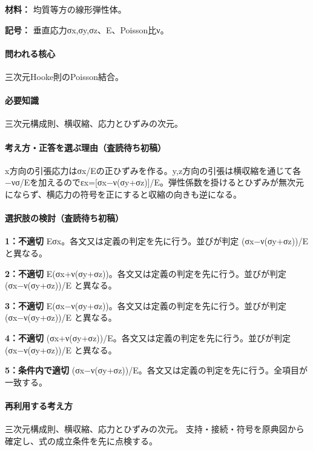 \noindent\textbf{材料：} 均質等方の線形弾性体。\par

\noindent\textbf{記号：} 垂直応力σx,σy,σz、E、Poisson比ν。\par

\paragraph{問われる核心} 三次元Hooke則のPoisson結合。

\paragraph{必要知識} 三次元構成則、横収縮、応力とひずみの次元。

\paragraph{考え方・正答を選ぶ理由（査読待ち初稿）} x方向の引張応力はσx/Eの正ひずみを作る。y,z方向の引張は横収縮を通じて各−νσ/Eを加えるのでεx=[σx−ν(σy+σz)]/E。弾性係数を掛けるとひずみが無次元にならず、横応力の符号を正にすると収縮の向きも逆になる。

\paragraph{選択肢の検討（査読待ち初稿）}\mbox{}\par

\noindent\textbf{1：不適切} Eσx。各文又は定義の判定を先に行う。並びが判定 (σx−ν(σy+σz))/E と異なる。\par

\noindent\textbf{2：不適切} E(σx+ν(σy+σz))。各文又は定義の判定を先に行う。並びが判定 (σx−ν(σy+σz))/E と異なる。\par

\noindent\textbf{3：不適切} E(σx−ν(σy+σz))。各文又は定義の判定を先に行う。並びが判定 (σx−ν(σy+σz))/E と異なる。\par

\noindent\textbf{4：不適切} (σx+ν(σy+σz))/E。各文又は定義の判定を先に行う。並びが判定 (σx−ν(σy+σz))/E と異なる。\par

\noindent\textbf{5：条件内で適切} (σx−ν(σy+σz))/E。各文又は定義の判定を先に行う。全項目が一致する。\par

\paragraph{再利用する考え方} 三次元構成則、横収縮、応力とひずみの次元。 支持・接続・符号を原典図から確定し、式の成立条件を先に点検する。

